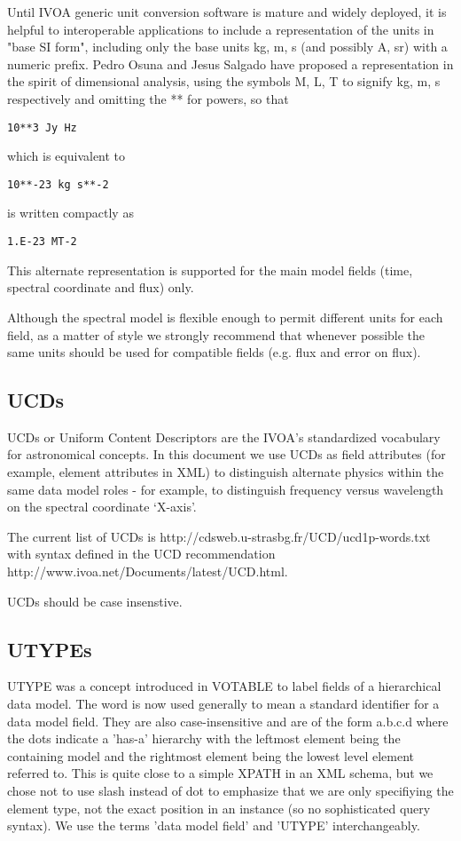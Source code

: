 \documentclass[11pt]{article}
\begin{document}
Until IVOA generic unit conversion software is mature and widely deployed, 
it is helpful to interoperable applications to include a representation
of the units in "base SI form", including only the base units kg, m, s (and
possibly A, sr) with a numeric prefix. Pedro Osuna and Jesus Salgado have proposed
a representation in the spirit of dimensional analysis, using the symbols
M, L, T to signify kg, m, s respectively and omitting the ** for powers, so
that 
\begin{verbatim}
10**3 Jy Hz
\end{verbatim}
which is equivalent to
\begin{verbatim}
10**-23 kg s**-2
\end{verbatim}
is written compactly as
\begin{verbatim}
1.E-23 MT-2
\end{verbatim}

This alternate representation is supported for the
main model fields (time, spectral coordinate and flux) only.



Although the spectral model is flexible enough to permit different units
for each field, as a matter of style we strongly recommend that whenever
possible the
same units should be used for compatible fields (e.g. flux and error on flux).

\subsection{UCDs}

UCDs or Uniform Content Descriptors are the IVOA's standardized vocabulary
for astronomical concepts. In this document we use UCDs as field attributes
(for example, element attributes in XML) to distinguish alternate 
physics within the same data model roles - for example, to distinguish
frequency versus wavelength on the spectral coordinate `X-axis'.

The current list of UCDs is
http://cdsweb.u-strasbg.fr/UCD/ucd1p-words.txt
with syntax defined in the UCD recommendation
http://www.ivoa.net/Documents/latest/UCD.html.

UCDs should be case insenstive.

\subsection{UTYPEs}

UTYPE was a concept introduced in VOTABLE to label fields of a hierarchical
data model. The word is now used generally to mean a standard identifier
for a data model field. They are also case-insensitive and are of the
form a.b.c.d  where the dots indicate a 'has-a' hierarchy
with the leftmost element being the containing model and the rightmost
element being the lowest level element referred to. This is quite close
to a simple XPATH in an XML schema, but we chose not to use slash instead of
dot to emphasize that we are only specifiying the element type, not the
exact position in an instance (so no sophisticated query syntax).
We use the terms 'data model field' and 'UTYPE' interchangeably.
\end{document}
